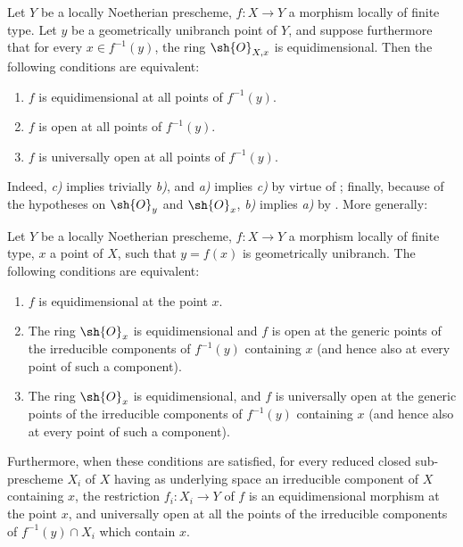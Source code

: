 \begin{corollary}[14.4.6]
\label{IV.14.4.6}
Let $Y$ be a locally Noetherian prescheme, $f:X\to Y$ a morphism locally of finite type.
Let $y$ be a geometrically unibranch point of $Y$, and suppose furthermore that for every $x\in f^{-1}(y)$, the ring $\sh{O}_{X,x}$ is equidimensional.
Then the following conditions are equivalent:
\begin{enumerate}[label=\emph{\alph*)}]
  \item $f$ is equidimensional  at all points of $f^{-1}(y)$.
  \item $f$ is open at all points of $f^{-1}(y)$.
  \item $f$ is universally open at all points of $f^{-1}(y)$.
\end{enumerate}
\end{corollary}

Indeed, \emph{c)} implies trivially \emph{b)}, and \emph{a)} implies \emph{c)} by virtue of ; finally, because of the hypotheses on $\sh{O}_y$ and $\sh{O}_x$, \emph{b)} implies \emph{a)} by .
More generally:

\begin{proposition}[14.4.7]
\label{IV.14.4.7}
Let $Y$ be a locally Noetherian prescheme, $f:X\to Y$ a morphism locally of finite type, $x$ a point of $X$, such that $y=f(x)$ is geometrically unibranch.
The following conditions are equivalent:
\begin{enumerate}[label=\emph{\alph*)}]
  \item $f$ is equidimensional  at the point $x$.
  \item The ring $\sh{O}_x$ is equidimensional and $f$ is open at the generic points of the irreducible components of $f^{-1}(y)$ containing $x$ (and hence also at every point of such a component).
  \item The ring $\sh{O}_x$ is equidimensional, and $f$ is universally open at the generic points of the irreducible components of $f^{-1}(y)$ containing $x$ (and hence also at every point of such a component).
\end{enumerate}
Furthermore, when these conditions are satisfied, for every reduced closed sub-prescheme $X_i$ of $X$ having as underlying space an irreducible component of $X$ containing $x$, the restriction $f_i:X_i\to Y$ of $f$ is an equidimensional morphism at the point $x$, and universally open at all the points of the irreducible components of $f^{-1}(y)\cap X_i$ which contain $x$.
\end{proposition}


